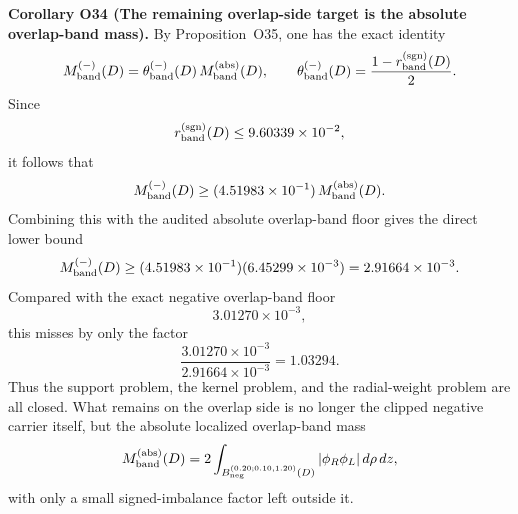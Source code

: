 \documentclass[aps,prd,onecolumn,notitlepage,nofootinbib,superscriptaddress,11pt,floatfix]{revtex4-2}
\begin{document}
\medskip\noindent\textbf{Corollary O34 (The remaining overlap-side target is the absolute overlap-band mass).}
By Proposition~O35, one has the exact identity
\[
M_{\rm band}^{(-)}(D)
=
\theta_{\rm band}^{(-)}(D)\,M_{\rm band}^{\rm(abs)}(D),
\qquad
\theta_{\rm band}^{(-)}(D)=\frac{1-r_{\rm band}^{\rm(sgn)}(D)}{2}.
\]
Since
\[
r_{\rm band}^{\rm(sgn)}(D)\le 9.60339\times10^{-2},
\]
it follows that
\[
M_{\rm band}^{(-)}(D)
\ge
(4.51983\times10^{-1})\,M_{\rm band}^{\rm(abs)}(D).
\]
Combining this with the audited absolute overlap-band floor gives the direct lower bound
\[
M_{\rm band}^{(-)}(D)
\ge
(4.51983\times10^{-1})(6.45299\times10^{-3})
=
2.91664\times10^{-3}.
\]
Compared with the exact negative overlap-band floor
\[
3.01270\times10^{-3},
\]
this misses by only the factor
\[
\frac{3.01270\times10^{-3}}{2.91664\times10^{-3}}
=
1.03294.
\]
Thus the support problem, the kernel problem, and the radial-weight problem are all closed. What remains on the overlap side is no longer the clipped negative carrier itself, but the absolute localized overlap-band mass
\[
M_{\rm band}^{\rm(abs)}(D)
=
2\int_{B_{\rm neg}^{(0.20;0.10,1.20)}(D)} |\phi_R\phi_L|\,d\rho\,dz,
\]
with only a small signed-imbalance factor left outside it.
\end{document}
